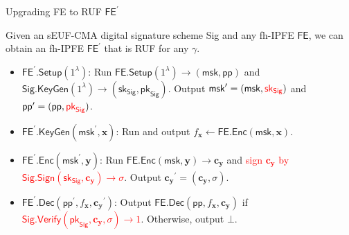 \begin{frame}{Upgrading \textsf{FE} to RUF $\textsf{FE}^\prime$}

\begin{theorem}
	Given an sEUF-CMA digital signature scheme \textsf{Sig} and any fh-IPFE $\textsf{FE}$, we can obtain an fh-IPFE $\textsf{FE}^\prime$ that is RUF for any $\gamma$.
\end{theorem}

\begin{itemize}

	\item<2-> $\textsf{FE}^\prime \textsf{.Setup}(1^\lambda)$: Run $\textsf{FE.Setup}(1^\lambda) \to (\textsf{msk}, \textsf{pp})$ and $\textsf{Sig.KeyGen}(1^\lambda) \to (\textsf{sk}_{\textsf{Sig}}, \textsf{pk}_{\textsf{Sig}} )$. Output $\textsf{msk}^\prime = (\textsf{msk}, \textcolor{red}{\textsf{sk}_{\textsf{Sig}}} )$ and $\textsf{pp}^\prime = (\textsf{pp}, \textcolor{red}{ \textsf{pk}_{\textsf{Sig}} } )$.

	\item<3-> $\textsf{FE}^\prime \textsf{.KeyGen}(\textsf{msk}^\prime, \mathbf{x})$: Run and output $f_{\mathbf{x}} \gets \textsf{FE.Enc}(\textsf{msk}, \mathbf{x})$.

	\item<4-> $\textsf{FE}^\prime \textsf{.Enc}(\textsf{msk}^\prime, \mathbf{y})$: Run $\textsf{FE.Enc}(\textsf{msk}, \mathbf{y}) \to \mathbf{c_y}$ and \textcolor{red}{sign $\mathbf{c_y}$ by $\textsf{Sig.Sign}(\textsf{sk}_{\textsf{Sig}}, \mathbf{c_y}) \to \sigma$}. Output $\mathbf{c_y}^\prime = (\mathbf{c_y}, \sigma)$.

	\item<5-> $\textsf{FE}^\prime \textsf{.Dec}(\textsf{pp}^\prime, f_\mathbf{x}, \mathbf{c_y}^\prime )$: Output $\textsf{FE.Dec}(\textsf{pp}, f_\mathbf{x}, \mathbf{c_y})$ if \textcolor{red}{ $\textsf{Sig.Verify}(\textsf{pk}_{\textsf{Sig}}, \mathbf{c_y}, \sigma ) \to 1$}. Otherwise, output $\bot$.

\end{itemize}

\end{frame}


